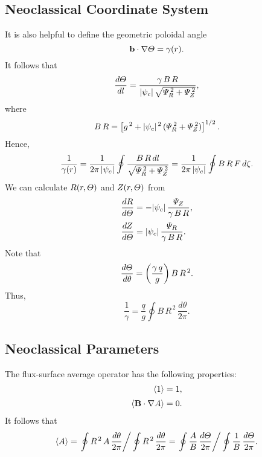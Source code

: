 \documentclass[12pt]{article}
\begin{document}
\subsection{Neoclassical Coordinate System}
It is also helpful to define the geometric poloidal angle
\begin{equation}
{\bf b}\cdot\nabla {\mit\Theta} = \gamma(r).
\end{equation}
It follows that
\begin{equation}
\frac{d{\mit\Theta}}{dl} = \frac{\gamma\,B\,R}{|\psi_c|\,\sqrt{{\mit\Psi}_R^{\,2}+{\mit\Psi}_Z^{\,2}}},
\end{equation}
where
\begin{equation}
B\,R = \left[g^{\,2} + |\psi_c|^{\,2}\,({\mit\Psi}_R^{\,2}+{\mit\Psi}_Z^{\,2})\right]^{1/2}.
\end{equation}
Hence,
\begin{equation}
\frac{1}{\gamma(r)} = \frac{1}{2\pi\,|\psi_c|}\oint\frac{B\,R\,dl}{\sqrt{{\mit\Psi}_R^{\,2}+{\mit\Psi}_Z^{\,2}}}= \frac{1}{2\pi\,|\psi_c|}\oint B\,R\,F\,d\zeta.
\end{equation}
We can calculate $R(r,{\mit\Theta})$ and $Z(r,{\mit\Theta})$ from 
\begin{align}
\frac{dR}{d{\mit\Theta}} &=-|\psi_c|\,\frac{{\mit\Psi}_Z}{\gamma\,B\,R},\\[0.5ex]
\frac{dZ}{d{\mit\Theta}} &=|\psi_c|\,\frac{{\mit\Psi}_R}{\gamma\,B\,R}.
\end{align}
Note that
\begin{equation}
\frac{d{\mit\Theta}}{d\theta} = \left(\frac{\gamma\,q}{g}\right)B\,R^{\,2}.
\end{equation}
Thus,
\begin{equation}
\frac{1}{\gamma} = \frac{q}{g}\oint B\,R^{\,2}\,\frac{d\theta}{2\pi}.
\end{equation}

\subsection{Neoclassical Parameters}
The flux-surface average operator has the following
properties:
\begin{align}
\langle 1\rangle &= 1,\\[0.5ex]
\langle {\bf B}\cdot\nabla A\rangle &= 0.
\end{align}
It follows that
\begin{equation}\label{e140}
\langle A\rangle =\left.\oint R^{\,2}\,A\,\frac{d\theta}{2\pi}\right/\oint R^{\,2}\,\frac{d\theta}{2\pi}=\left.\oint
\frac{A}{B}\,\frac{d{\mit\Theta}}{2\pi}\right/\oint
\frac{1}{B}\,\frac{d{\mit\Theta}}{2\pi}.
\end{equation}
\end{document}
